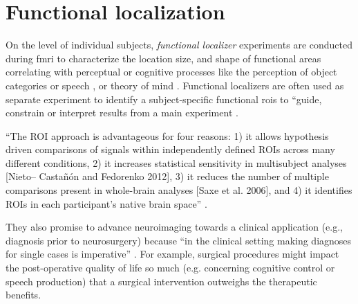 \section{Functional localization}

On the level of individual subjects, \textit{functional localizer} experiments
\citep[e.g.,][for reviews]{saxe2006divide, friston2006critique} are conducted
during \ac{fmri} to characterize the location size, and shape of functional
areas correlating with perceptual or cognitive processes like the perception of
object categories \citep{kanwisher1997ffa} or speech
\citep{fernandez2001language}, or theory of mind \citep{spunt2014validating}.
Functional localizers are often used as separate experiment to identify a
subject-specific functional \acp{roi} to ``guide, constrain or interpret results
from a main experiment \citep{saxe2006divide}.

``The ROI approach is advantageous for four reasons:
%
1) it allows hypothesis driven comparisons of signals within independently
defined ROIs across many different conditions,
%
2) it increases statistical sensitivity in multisubject analyses [Nieto–
Castañón and Fedorenko 2012],
%
3) it reduces the number of multiple comparisons present in whole-brain analyses
[Saxe et al.  2006], and
%
4) it identifies ROIs in each participant's native brain space''
\citep{rosenke2021probabilistic}.

They also promise to advance neuroimaging towards a clinical application (e.g.,
diagnosis prior to neurosurgery) because ``in the clinical setting making
diagnoses for single cases is imperative'' \citep{wegrzyn2018thought}.
For example, surgical procedures might impact the post-operative quality of life
so much (e.g. concerning cognitive control or speech production) that a surgical
intervention outweighs the therapeutic benefits.

